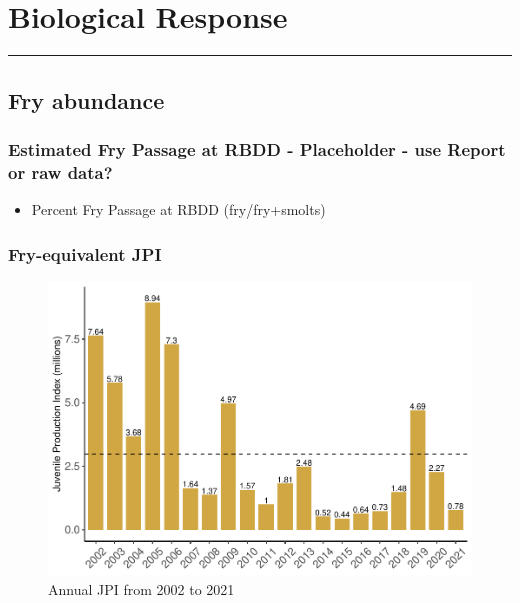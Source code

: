 \documentclass[
]{book}
\providecommand{\tightlist}{%
  \setlength{\itemsep}{0pt}\setlength{\parskip}{0pt}}
\theoremstyle{definition}
\theoremstyle{definition}
\theoremstyle{definition}
\theoremstyle{definition}
\theoremstyle{remark}
\begin{document}
\hypertarget{biological-response-2}{%
\section{Biological Response}\label{biological-response-2}}

\begin{center}\rule{0.5\linewidth}{0.5pt}\end{center}

\hypertarget{fry-abundance}{%
\subsection{Fry abundance}\label{fry-abundance}}

\hypertarget{estimated-fry-passage-at-rbdd---placeholder---use-report-or-raw-data}{%
\subsubsection{Estimated Fry Passage at RBDD - Placeholder - use Report or raw data?}\label{estimated-fry-passage-at-rbdd---placeholder---use-report-or-raw-data}}

\begin{itemize}
\tightlist
\item
  Percent Fry Passage at RBDD (fry/fry+smolts)
\end{itemize}

\hypertarget{fry-equivalent-jpi}{%
\subsubsection{Fry-equivalent JPI}\label{fry-equivalent-jpi}}

\begin{figure}
\centering
\includegraphics{_main_files/figure-latex/JPI-fig-1.pdf}
\caption{\label{fig:JPI-fig}Annual JPI from 2002 to 2021}
\end{figure}
\end{document}
